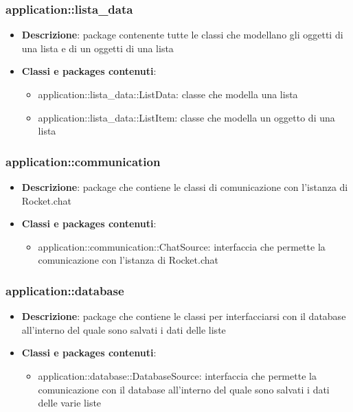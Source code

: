\subsubsection{application::lista\_data}
\begin{itemize}
	\item \textbf{Descrizione}: package contenente tutte le classi che modellano gli oggetti di una lista e di un oggetti di una lista
	\item \textbf{Classi e packages contenuti}:
	\begin{itemize}
	\item application::lista\_data::ListData: classe che modella una lista
	\item application::lista\_data::ListItem: classe che modella un oggetto di una lista
	\end{itemize}
\end{itemize}

\subsubsection{application::communication}
\begin{itemize}
	\item \textbf{Descrizione}: package che contiene le classi di comunicazione con l'istanza di Rocket.chat
	\item \textbf{Classi e packages contenuti}:
	\begin{itemize}
	\item application::communication::ChatSource: interfaccia che permette la comunicazione con l'istanza di Rocket.chat
	\end{itemize}
\end{itemize}

\subsubsection{application::database}
\begin{itemize}
	\item \textbf{Descrizione}: package che contiene le classi per interfacciarsi con il database all'interno del quale sono salvati i dati delle liste
	\item \textbf{Classi e packages contenuti}:
	\begin{itemize}
	\item application::database::DatabaseSource: interfaccia che permette la comunicazione con il database all'interno del quale sono salvati i dati delle varie liste
	\end{itemize}
\end{itemize}

